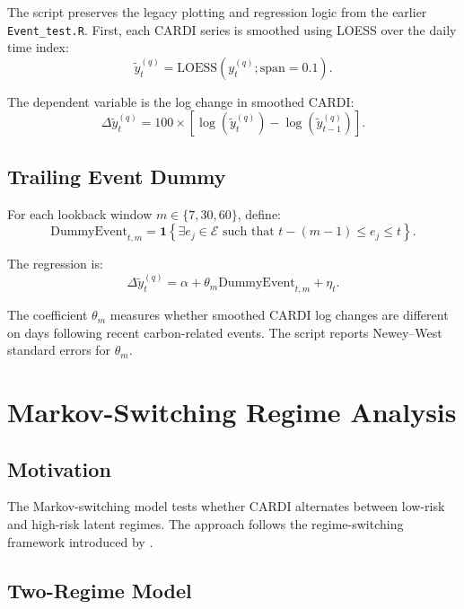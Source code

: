 \documentclass[11pt]{article}
\begin{document}
The script preserves the legacy plotting and regression logic from the earlier
\texttt{Event\_test.R}. First, each CARDI series is smoothed using LOESS over
the daily time index:
\begin{equation}
\widetilde{y}_t^{(q)}
=
\mathrm{LOESS}\left(y_t^{(q)}; \mathrm{span}=0.1\right).
\end{equation}

The dependent variable is the log change in smoothed CARDI:
\begin{equation}
\Delta \widetilde{y}_t^{(q)}
=
100 \times
\left[
\log\left(\widetilde{y}_t^{(q)}\right)
-
\log\left(\widetilde{y}_{t-1}^{(q)}\right)
\right].
\end{equation}

\subsection{Trailing Event Dummy}

For each lookback window \(m \in \{7,30,60\}\), define:
\begin{equation}
\text{DummyEvent}_{t,m}
=
\mathbf{1}
\left\{
\exists e_j \in \mathcal{E}
\text{ such that }
t-(m-1) \leq e_j \leq t
\right\}.
\end{equation}

The regression is:
\begin{equation}
\Delta \widetilde{y}_t^{(q)}
=
\alpha
+ \theta_m \text{DummyEvent}_{t,m}
+ \eta_t.
\end{equation}

The coefficient \(\theta_m\) measures whether smoothed CARDI log changes are
different on days following recent carbon-related events. The script reports
Newey--West standard errors for \(\theta_m\).

\section{Markov-Switching Regime Analysis}

\subsection{Motivation}

The Markov-switching model tests whether CARDI alternates between low-risk and
high-risk latent regimes. The approach follows the regime-switching framework
introduced by \citet{hamilton1989}.

\subsection{Two-Regime Model}
\end{document}
